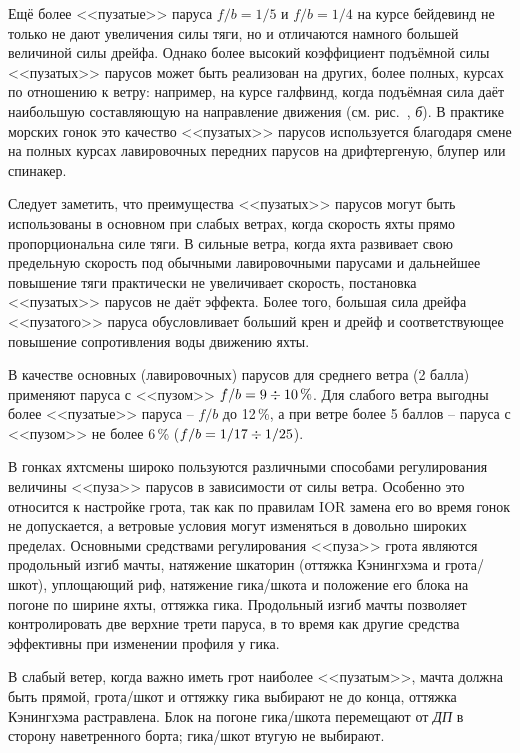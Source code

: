 Ещё более <<пузатые>> паруса $f/b=1/5$ и $f/b=1/4$ на курсе бейдевинд не только не дают увеличения силы тяги, но и отличаются намного большей величиной силы дрейфа. Однако более высокий коэффициент подъёмной силы <<пузатых>> парусов может быть реализован на других, более полных, курсах по отношению к ветру: например, на курсе галфвинд, когда подъёмная сила даёт наибольшую составляющую на направление движения (см. рис.~, \textit{б}). В практике морских гонок это качество <<пузатых>> парусов используется благодаря смене на полных курсах лавировочных передних парусов на дрифтергеную, блупер или спинакер.

Следует заметить, что преимущества <<пузатых>> парусов могут быть использованы в основном при слабых ветрах, когда скорость яхты прямо пропорциональна силе тяги. В сильные ветра, когда яхта развивает свою предельную скорость под обычными лавировочными парусами и дальнейшее повышение тяги практически не увеличивает скорость, постановка <<пузатых>> парусов не даёт эффекта. Более того, большая сила дрейфа <<пузатого>> паруса обусловливает больший крен и дрейф и соответствующее повышение сопротивления воды движению яхты. 

В качестве основных (лавировочных) парусов для среднего ветра (2 балла) применяют паруса с <<пузом>> $f/b=9\div 10\,\%$. Для слабого ветра выгодны более <<пузатые>> паруса \--- $f/b$ до 12\,\%, а при ветре более 5 баллов \--- паруса с <<пузом>> не более 6\,\% ($f/b=1/17\div 1/25$). 

В гонках яхтсмены широко пользуются различными способами регулирования величины <<пуза>> парусов в зависимости от силы ветра. Особенно это относится к настройке грота, так как по правилам IOR замена его во время гонок не допускается, а ветровые условия могут изменяться в довольно широких пределах. Основными средствами регулирования <<пуза>> грота являются продольный изгиб мачты, натяжение шкаторин (оттяжка Кэнингхэма и грота\-/шкот), уплощающий риф, натяжение гика\-/шкота и положение его блока на погоне по ширине яхты, оттяжка гика. Продольный изгиб мачты позволяет контролировать две верхние трети паруса, в то время как другие средства эффективны при изменении профиля у гика.

В слабый ветер, когда важно иметь грот наиболее <<пузатым>>, мачта должна быть прямой, грота\-/шкот и оттяжку гика выбирают не до конца, оттяжка Кэнингхэма растравлена. Блок на погоне гика\-/шкота перемещают от \textit{ДП} в сторону наветренного борта; гика\-/шкот втугую не выбирают.

